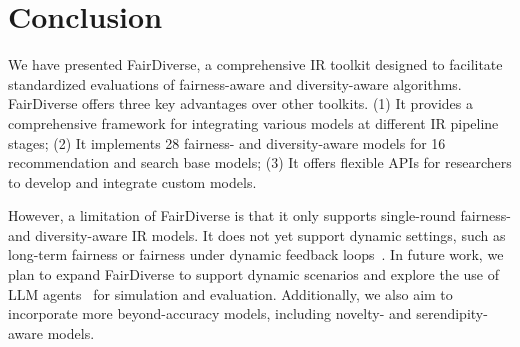 
\section{Conclusion}

We have presented FairDiverse, a comprehensive IR toolkit designed to facilitate standardized evaluations of fairness-aware and diversity-aware algorithms. FairDiverse offers three key advantages over other toolkits. (1) It provides a comprehensive framework for integrating various models at different IR pipeline stages; (2) It implements 28 fairness- and diversity-aware models for 16 recommendation and search base models; (3) It offers flexible APIs for researchers to develop and integrate custom models. 


However, a limitation of FairDiverse is that it only supports single-round fairness- and diversity-aware IR models. It does not yet support dynamic settings, such as long-term fairness or fairness under dynamic feedback loops~\cite{xu2023ltp}. In future work, we plan to expand FairDiverse to support dynamic scenarios and explore the use of LLM agents~\cite{zhang2024generative} for simulation and evaluation. Additionally, we also aim to incorporate more beyond-accuracy models, including novelty- and serendipity-aware models.